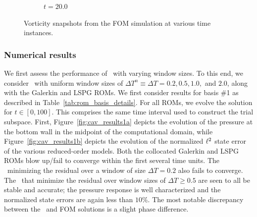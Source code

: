 \begin{figure}
\begin{center}
\begin{subfigure}[t]{0.49\textwidth}
\caption{$t=20.0$}
\end{subfigure}
\caption{Vorticity snapshots from the FOM simulation at various time instances.} 
\label{fig:fom_sols_cav}
\end{center}
\end{figure}


\subsubsection{Numerical results}
We first assess the performance of \methodAcronymROMs\ with varying window sizes. To this end, we consider \methodAcronymROMs\ with uniform window 
sizes of $\Delta T^n \equiv \Delta T = 0.2,0.5,1.0,$ and $2.0$, along with the Galerkin and LSPG ROMs. We first consider results for basis \#1 as described in 
Table~\ref{tab:rom_basis_details}. For all ROMs, we evolve 
the solution for $t \in [0,100]$. This comprises the same time interval used to construct the trial subspace. First, Figure~\ref{fig:cav_results1a} depicts the evolution of the pressure at the bottom wall in the midpoint of the computational domain, while Figure~\ref{fig:cav_results1b} depicts the evolution of the normalized $\ell^2$ state error of the various reduced-order models. Both the collocated Galerkin and LSPG ROMs blow up/fail to converge within the first several time units. The \methodAcronymROM\ minimizing the residual over a window of size $\Delta T = 0.2$ also fails to converge. The \methodAcronymROMs\ that minimize the residual over window sizes of $\Delta T \ge 0.5$ are seen to all be stable and accurate; the pressure response is well characterized and the normalized state errors are again less than $10\%$. The most notable discrepancy between the \methodAcronymROM\ and FOM solutions is a slight phase difference. 






